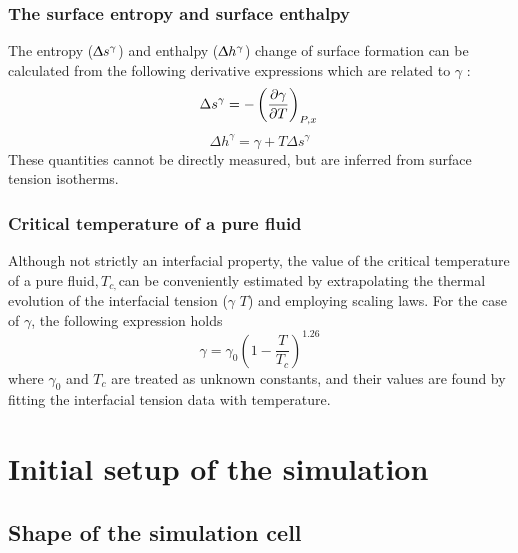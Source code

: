 \documentclass[9pt,bestpractices]{livecoms}
\begin{document}
\subsubsection{The surface entropy and surface enthalpy}

The entropy (${\Updelta}s^{{\gamma}}$) and enthalpy
(${\Updelta}h^{{\gamma}}$) change of surface formation can be
calculated from the following derivative expressions which are related to
{${\gamma}$} \citep{rowlinson1982}: 
\begin{equation}
  \Delta s^{\gamma} =-\left(\frac{\partial\gamma}{\partial T}\right)_{P,x} \\
  \label{eq:6}
\end{equation}
\begin{equation}
  \Delta h^{\gamma} =\gamma+T\Delta s^{\gamma}
  \label{eq:7}
\end{equation}
These quantities cannot be directly measured, but are inferred from surface tension isotherms.

\subsubsection{Critical temperature of a pure fluid}

Although not strictly an interfacial property, the value of the critical
temperature of a pure fluid$, T_{c, }$can be conveniently estimated by
extrapolating the thermal evolution of the interfacial tension (${\gamma}$
\textendash{} $T$) and employing scaling laws. For the
case of ${\gamma}$, the following expression holds \citep{rowlinson1982}
\begin{equation}
\gamma=\gamma_{0}\left(1-\frac{T}{T_{c}}\right)^{1.26}
\label{eq:8}
\end{equation}
where ${\gamma}_{0}$ and $T_{c}$ are treated as unknown constants,
and their values are found by fitting the interfacial tension data with
temperature.

\section{Initial setup of the simulation}
\label{sec:setup}
\subsection{Shape of the simulation cell}
\end{document}
